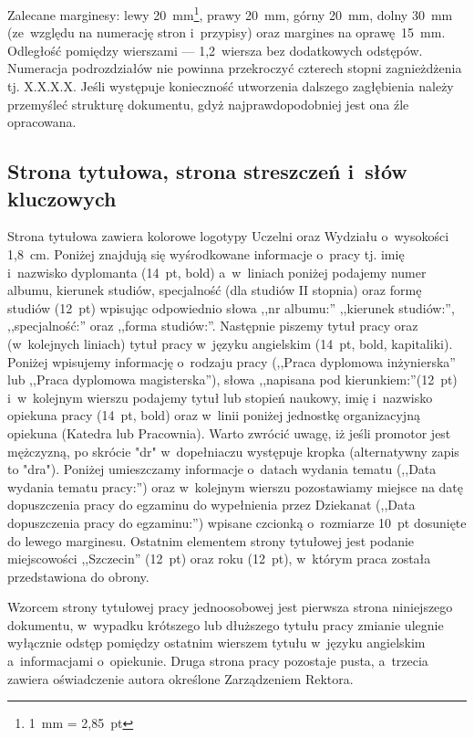 \documentclass[skorowidz,skroty]{dyplomWEZUT}
\begin{document}
Zalecane marginesy: lewy 20~mm\footnote{1~mm = 2,85~pt}, prawy 20~mm, górny 20~mm, dolny 30~mm (ze~względu na numerację stron i~przypisy) oraz margines na oprawę~15~mm. Odległość pomiędzy wierszami --- 1,2~wiersza bez dodatkowych odstępów. Numeracja podrozdziałów nie powinna przekroczyć czterech stopni zagnieżdżenia tj. X.X.X.X. Jeśli występuje konieczność utworzenia dalszego zagłębienia należy przemyśleć strukturę dokumentu, gdyż najprawdopodobniej jest ona źle opracowana.

\subsection{Strona tytułowa, strona streszczeń i~słów kluczowych}

Strona tytułowa zawiera kolorowe logotypy Uczelni oraz Wydziału o~wysokości 1,8~cm. Poniżej znajdują się wyśrodkowane informacje o~pracy tj. imię i~nazwisko dyplomanta (14~pt, bold) a~w~liniach poniżej podajemy numer albumu, kierunek studiów, specjalność (dla studiów II stopnia) oraz formę studiów (12~pt) wpisując odpowiednio słowa ,,nr albumu:'' ,,kierunek studiów:'', ,,specjalność:'' oraz ,,forma studiów:''. Następnie piszemy tytuł pracy oraz (w~kolejnych liniach) tytuł pracy w~języku angielskim (14~pt, bold, kapitaliki). Poniżej wpisujemy informację o~rodzaju pracy (,,Praca dyplomowa inżynierska'' lub ,,Praca dyplomowa magisterska''), słowa ,,napisana pod kierunkiem:''(12~pt) i~w~kolejnym wierszu podajemy tytuł lub stopień naukowy, imię i~nazwisko opiekuna pracy (14~pt, bold) oraz w~linii poniżej jednostkę organizacyjną opiekuna (Katedra lub Pracownia). Warto zwrócić uwagę, iż jeśli promotor jest mężczyzną, po skrócie "dr"  w~dopełniaczu występuje kropka (alternatywny zapis to "dra"). Poniżej umieszczamy informacje o~datach wydania tematu (,,Data wydania tematu pracy:'') oraz w~kolejnym wierszu pozostawiamy miejsce na datę dopuszczenia pracy do egzaminu do wypełnienia przez Dziekanat (,,Data dopuszczenia pracy do egzaminu:'') wpisane czcionką o~rozmiarze 10~pt dosunięte do lewego marginesu. Ostatnim elementem strony tytułowej jest podanie miejscowości ,,Szczecin'' (12~pt) oraz roku (12~pt), w~którym praca została przedstawiona do obrony.

Wzorcem strony tytułowej pracy jednoosobowej jest pierwsza strona niniejszego dokumentu, w~wypadku krótszego lub dłuższego tytułu pracy zmianie ulegnie wyłącznie odstęp pomiędzy ostatnim wierszem tytułu w~języku angielskim a~informacjami o~opiekunie. Druga strona pracy pozostaje pusta, a~trzecia zawiera oświadczenie autora określone Zarządzeniem Rektora.
\end{document}
